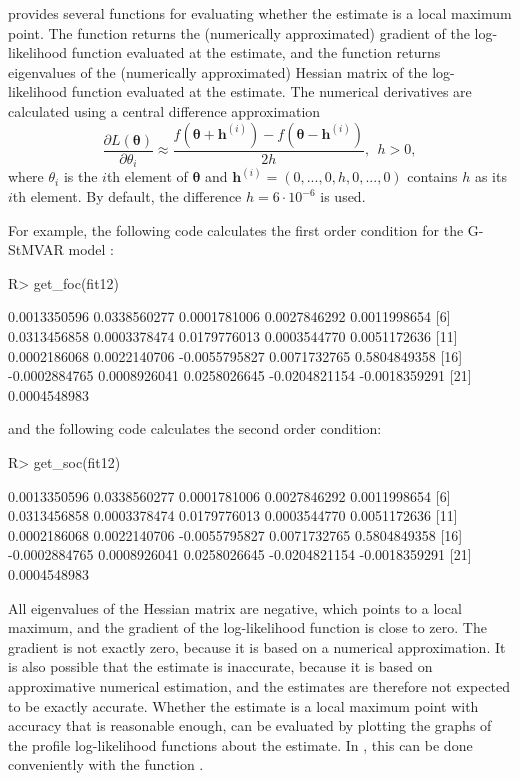 \documentclass[nojss]{jss}
\begin{document}
 provides several functions for evaluating whether the estimate is a local maximum point. The function  returns the (numerically approximated) gradient of the log-likelihood function evaluated at the estimate, and the function  returns eigenvalues of the (numerically approximated) Hessian matrix of the log-likelihood function evaluated at the estimate. The numerical derivatives are calculated using a central difference approximation
\begin{equation}
\frac{\partial L(\boldsymbol{\theta})}{\partial \theta_i} \approx \frac{f(\boldsymbol{\theta} + \boldsymbol{h}^{(i)}) - f(\boldsymbol{\theta} - \boldsymbol{h}^{(i)})}{2h}, \ \ h>0,
\end{equation}
where $\theta_i$ is the $i$th element of $\boldsymbol{\theta}$ and $\boldsymbol{h}^{(i)}=(0,...,0,h,0,...,0)$
contains $h$ as its $i$th element. By default, the difference $h=6\cdot 10^{-6}$ is used.

For example, the following code calculates the first order condition for the G-StMVAR model :
%
\begin{CodeChunk}
\begin{CodeInput}
R> get_foc(fit12)
\end{CodeInput}
\begin{CodeOutput}
 [1]  0.0013350596  0.0338560277  0.0001781006  0.0027846292  0.0011998654
 [6]  0.0313456858  0.0003378474  0.0179776013  0.0003544770  0.0051172636
[11]  0.0002186068  0.0022140706 -0.0055795827  0.0071732765  0.5804849358
[16] -0.0002884765  0.0008926041  0.0258026645 -0.0204821154 -0.0018359291
[21]  0.0004548983
\end{CodeOutput}
\end{CodeChunk}
%
and the following code calculates the second order condition:
%
\begin{CodeChunk}
\begin{CodeInput}
R> get_soc(fit12)
\end{CodeInput}
\begin{CodeOutput}
 [1]  0.0013350596  0.0338560277  0.0001781006  0.0027846292  0.0011998654
 [6]  0.0313456858  0.0003378474  0.0179776013  0.0003544770  0.0051172636
[11]  0.0002186068  0.0022140706 -0.0055795827  0.0071732765  0.5804849358
[16] -0.0002884765  0.0008926041  0.0258026645 -0.0204821154 -0.0018359291
[21]  0.0004548983
\end{CodeOutput}
\end{CodeChunk}
%
All eigenvalues of the Hessian matrix are negative, which points to a local maximum, and the gradient of the log-likelihood function is close to zero. The gradient is not exactly zero, because it is based on a numerical approximation. It is also possible that the estimate is inaccurate, because it is based on approximative numerical estimation, and the estimates are therefore not expected to be exactly accurate. Whether the estimate is a local maximum point with accuracy that is reasonable enough, can be evaluated by plotting the graphs of the profile log-likelihood functions about the estimate. In , this can be done conveniently with the function .
\end{document}
